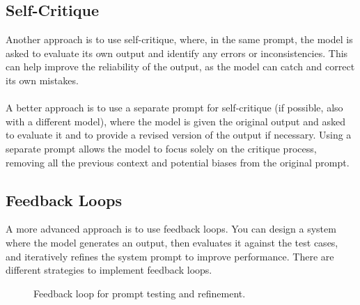\subsection{Self-Critique}
Another approach is to use self-critique, where, in the same prompt, the model is asked to evaluate its own output and identify any errors or inconsistencies.
This can help improve the reliability of the output, as the model can catch and correct its own mistakes.
\\\\
A better approach is to use a separate prompt for self-critique (if possible, also with a different model), where the model is given the original output and
asked to evaluate it and to provide a revised version of the output if necessary.
Using a separate prompt allows the model to focus solely on the critique process, removing all the previous context and potential biases from the original prompt.

\subsection{Feedback Loops}
A more advanced approach is to use feedback loops. 
You can design a system where the model generates an output, then evaluates it 
against the test cases, and iteratively refines the system prompt to improve performance.
There are different strategies to implement feedback loops.

\begin{figure}[htbp]
    \centering
    \caption{Feedback loop for prompt testing and refinement.}
    \label{fig:testing-feedback-loop}
\end{figure}

